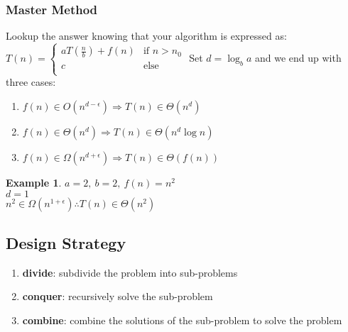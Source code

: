 \documentclass[]{article}
\theoremstyle{definition}
\newtheorem{ex}{Example}[section]
\begin{document}
			\subsubsection{Master Method}
				Lookup the answer knowing that your algorithm is expressed as: 
				$T(n) =
				\begin{cases}
					aT(\frac{n}{b}) + f(n) & \mbox{if } n > n_0 \\
					c & \mbox{else} \\
				\end{cases} 
				$
				Set $d = \log_{b}a$ and we end up with three cases:
				\begin{enumerate}
					\item $f(n) \in O(n^{d-\epsilon}) \Rightarrow T(n) \in \Theta(n^d)$
					\item $f(n) \in \Theta(n^{d}) \Rightarrow T(n) \in \Theta(n^{d}\log n)$
					\item $f(n) \in \Omega(n^{d+\epsilon}) \Rightarrow T(n) \in \Theta(f(n))$
				\end{enumerate}
				\begin{ex}
					$a=2,\ b=2,\ f(n) = n^2$ \\
					$d = 1$ \\
					$n^2 \in \Omega(n^{1 + \epsilon}) \therefore T(n) \in \Theta(n^2)$ 
				\end{ex}
		\subsection{Design Strategy}
			\begin{enumerate}
				\item \textbf{divide}: subdivide the problem into sub-problems
				\item \textbf{conquer}: recursively solve the sub-problem
				\item \textbf{combine}: combine the solutions of the sub-problem to solve the problem
			\end{enumerate}
							
\end{document}
